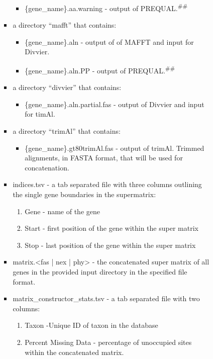 \documentclass{article}
\begin{document}
\begin{enumerate}[itemsep=12pt]
\begin{description}
\begin{itemize}
\begin{itemize}
\begin{itemize}
                \item \{gene\_name\}.aa.warning - output of PREQUAL.\textsuperscript{\#\#}
            \end{itemize}
        \item a directory “mafft” that contains:
        \begin{itemize}
            \item \{gene\_name\}.aln - output of  of MAFFT and input for Divvier.
            \item \{gene\_name\}.aln.PP - output of PREQUAL.\textsuperscript{\#\#}
        \end{itemize}
        \item a directory “divvier” that contains:
        \begin{itemize}
            \item \{gene\_name\}.aln.partial.fas - output of Divvier and input for timAl.
        \end{itemize}
        \item a directory “trimAl” that contains:
        \begin{itemize}
            \item \{gene\_name\}.gt80trimAl.fas - output of trimAl. Trimmed alignments, in FASTA format, that will be used for concatenation.
        \end{itemize}
        \item indices.tsv - a tab separated file with three columns outlining the single gene boundaries in the supermatrix:
        \begin{enumerate}[label=\arabic*.]
            \item Gene - name of the gene
            \item Start - first position of the gene within the super matrix
            \item Stop - last position of the gene within the super matrix
        \end{enumerate}
        \item matrix.<fas | nex | phy> - the concatenated super matrix of all genes in the provided input directory in the specified file format.
        \item matrix\_constructor\_stats.tsv - a tab separated file with two columns:
        \begin{enumerate}[label=\arabic*.]
            \item Taxon -Unique ID of taxon in the database
            \item Percent Missing Data - percentage of unoccupied sites within the concatenated matrix.

\end{enumerate}
\end{itemize}
\end{itemize}
\end{description}
\end{enumerate}
\end{document}

